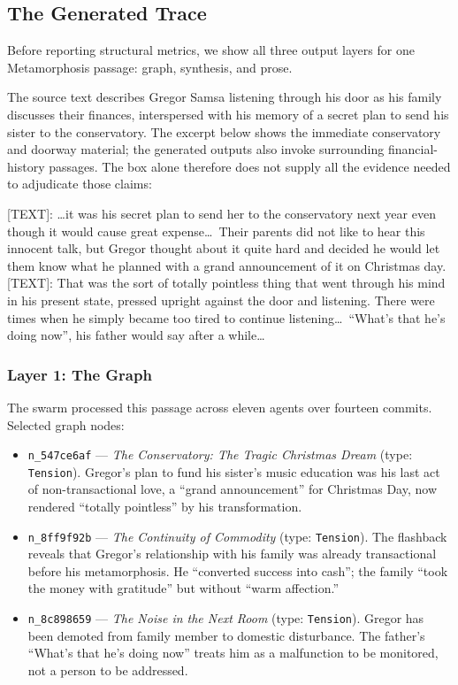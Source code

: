 \subsection{The Generated Trace}\label{sec:generated-trace}

Before reporting structural metrics, we show all three output layers for one
Metamorphosis passage: graph, synthesis, and prose.

The source text describes Gregor Samsa listening through his door as his family discusses their finances, interspersed with his memory of a secret plan to send his sister to the conservatory. The excerpt below shows the immediate conservatory and doorway material; the generated outputs also invoke surrounding financial-history passages. The box alone therefore does not supply all the evidence needed to adjudicate those claims:

\begin{metabox}
{[TEXT]}: \textrm{\ldots it was his secret plan to send her to the conservatory next year even though it would cause great expense\ldots\ Their parents did not like to hear this innocent talk, but Gregor thought about it quite hard and decided he would let them know what he planned with a grand announcement of it on Christmas day.}\\[0.5em]
{[TEXT]}: \textrm{That was the sort of totally pointless thing that went through his mind in his present state, pressed upright against the door and listening. There were times when he simply became too tired to continue listening\ldots\ ``What's that he's doing now'', his father would say after a while\ldots}
\end{metabox}

\subsubsection{Layer 1: The Graph}

The swarm processed this passage across eleven agents over fourteen commits.
Selected graph nodes:

\begin{itemize}
    \item \texttt{n\_547ce6af} --- \emph{The Conservatory: The Tragic Christmas Dream} (type: \texttt{Tension}). Gregor's plan to fund his sister's music education was his last act of non-transactional love, a ``grand announcement'' for Christmas Day, now rendered ``totally pointless'' by his transformation.

    \item \texttt{n\_8ff9f92b} --- \emph{The Continuity of Commodity} (type: \texttt{Tension}). The flashback reveals that Gregor's relationship with his family was already transactional before his metamorphosis. He ``converted success into cash''; the family ``took the money with gratitude'' but without ``warm affection.''

    \item \texttt{n\_8c898659} --- \emph{The Noise in the Next Room} (type: \texttt{Tension}). Gregor has been demoted from family member to domestic disturbance. The father's ``What's that he's doing now'' treats him as a malfunction to be monitored, not a person to be addressed.
\end{itemize}

